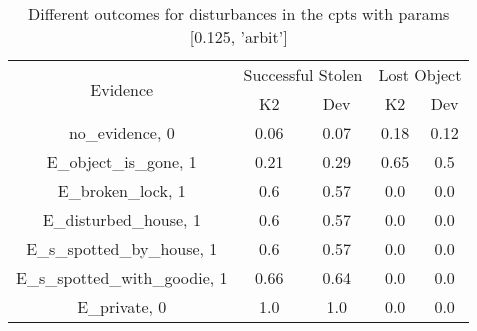 \begin{table}\begin{tabular}{c|cc|cc}\toprule\multirow{2}{*}{Evidence} & \multicolumn{2}{c}{Successful Stolen} & \multicolumn{2}{c}{Lost Object} \\& {K2} & {Dev} & {K2} & {Dev} \\\midrule
no\_evidence, 0 & \cellcolor{Bittersweet}0.06&\cellcolor{Bittersweet}0.07&\cellcolor{Bittersweet}0.18&\cellcolor{Bittersweet}0.12\\E\_object\_is\_gone, 1 & \cellcolor{Bittersweet}0.21&\cellcolor{Bittersweet}0.29&\cellcolor{Bittersweet}0.65&\cellcolor{Bittersweet}0.5\\E\_broken\_lock, 1 & \cellcolor{Bittersweet}0.6&\cellcolor{Bittersweet}0.57&0.0&0.0\\E\_disturbed\_house, 1 & \cellcolor{Bittersweet}0.6&\cellcolor{Bittersweet}0.57&0.0&0.0\\E\_s\_spotted\_by\_house, 1 & \cellcolor{Bittersweet}0.6&\cellcolor{Bittersweet}0.57&0.0&0.0\\E\_s\_spotted\_with\_goodie, 1 & \cellcolor{Bittersweet}0.66&\cellcolor{Bittersweet}0.64&0.0&0.0\\E\_private, 0 & 1.0&1.0&0.0&0.0\\\bottomrule\end{tabular}\caption{Different outcomes for disturbances in the cpts with params [0.125, 'arbit']}\end{table}